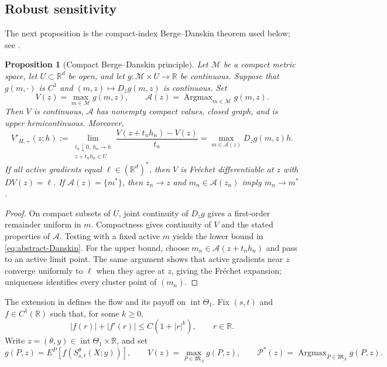 \documentclass[11pt,reqno]{amsart}
\theoremstyle{plain}
\newtheorem{proposition}[proposition]{Proposition}
\theoremstyle{definition}
\newcommand{\R}{\mathbb R}
\newcommand{\cP}{\mathcal P}
\newcommand{\Argmax}{\operatorname{Argmax}}
\begin{document}
\subsection{Robust sensitivity}

The next proposition is the compact-index Berge--Danskin theorem used
below; see \cite{BonnansShapiro00}.

\begin{proposition}[Compact Berge--Danskin principle]
\label{thm:compact-robust-envelope}
Let \(\mathcal M\) be a compact metric space, let \(U\subset\R^d\) be open,
and let \(g:\mathcal M\times U\to\R\) be continuous.  Suppose that
\(g(m,\cdot)\) is \(C^1\) and \((m,z)\mapsto D_zg(m,z)\) is continuous.
Set
\[
  V(z)=\max_{m\in\mathcal M}g(m,z),
  \qquad \mathcal A(z)=\Argmax_{m\in\mathcal M}g(m,z).
\]
Then \(V\) is continuous, \(\mathcal A\) has nonempty compact values,
closed graph, and is upper hemicontinuous.  Moreover,
\begin{equation}\label{eq:abstract-Danskin}
  V'_{H,+}(z;h)
  :=\lim_{\substack{t_n\downarrow0,\ h_n\to h\\z+t_nh_n\in U}}
  \frac{V(z+t_nh_n)-V(z)}{t_n}
  =\max_{m\in\mathcal A(z)}D_zg(m,z)h.
\end{equation}
If all active gradients equal \(\ell\in(\R^d)^*\), then \(V\) is
Fr\'echet differentiable at \(z\) with \(D V(z)=\ell\).  If
\(\mathcal A(z)=\{m^*\}\), then \(z_n\to z\) and
\(m_n\in\mathcal A(z_n)\) imply \(m_n\to m^*\).
\end{proposition}

\begin{proof}
On compact subsets of \(U\), joint continuity of \(D_zg\) gives a
first-order remainder uniform in \(m\).  Compactness gives continuity of
\(V\) and the stated properties of \(\mathcal A\).  Testing with a fixed
active \(m\) yields the lower bound in \eqref{eq:abstract-Danskin}.  For
the upper bound, choose \(m_n\in\mathcal A(z+t_nh_n)\) and pass to an
active limit point.  The same argument shows that active gradients near
\(z\) converge uniformly to \(\ell\) when they agree at \(z\), giving the
Fr\'echet expansion; uniqueness identifies every cluster point of
\((m_n)\).
\end{proof}

The extension in  defines the flow and its payoff on
\(\operatorname{int}\Theta_1\).  Fix \((s,t)\) and \(f\in C^1(\R)\) such
that, for some \(k\ge0\),
\begin{equation}\label{eq:payoff-polynomial-growth}
  |f(r)|+|f'(r)|\le C(1+|r|^k),
  \qquad r\in\R.
\end{equation}
Write
\(z=(\theta,y)\in\operatorname{int}\Theta_1\times\R\), and set
\[
  g(P,z)=E^P[f(S_{s,t}^\theta(X;y))],
  \qquad
  V(z)=\max_{P\in\mathfrak M_\Lambda}g(P,z),
  \qquad
  \cP^*(z)=\Argmax_{P\in\mathfrak M_\Lambda}g(P,z).
\]
\end{document}

